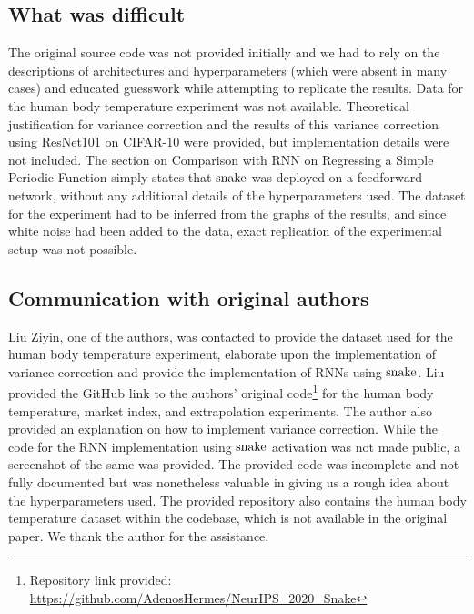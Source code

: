 \subsection{What was difficult}

The original source code was not provided initially and we had to rely on the descriptions of architectures and hyperparameters (which were absent in many cases) and educated guesswork while attempting to replicate the results. 
Data for the human body temperature experiment was not available. 
Theoretical justification for variance correction and the results of this variance correction using ResNet101 on CIFAR-10 were provided, but implementation details were not included. 
The section on Comparison with RNN on Regressing a Simple Periodic Function simply states that $ \operatorname{snake} $ was deployed on a feedforward network, without any additional details of the hyperparameters used. The dataset for the experiment had to be inferred from the graphs of the results, and since white noise had been added to the data, exact replication of the experimental setup was not possible.

\subsection{Communication with original authors}

Liu Ziyin, one of the authors, was contacted to provide the dataset used for the human body temperature experiment, elaborate upon the implementation of variance correction and provide the implementation of RNNs using $ \operatorname{snake} $. Liu provided the GitHub link to the authors' original code\footnote{Repository link provided: \url{https://github.com/AdenosHermes/NeurIPS_2020_Snake}} for the human body temperature, market index, and extrapolation experiments. The author also provided an explanation on how to implement variance correction. While the code for the RNN implementation using $ \operatorname{snake} $ activation was not made public, a screenshot of the same was provided. The provided code was incomplete and not fully documented but was nonetheless valuable in giving us a rough idea about the hyperparameters used. The provided repository also contains the human body temperature dataset within the codebase, which is not available in the original paper. We thank the author for the assistance.